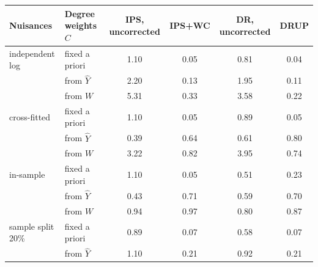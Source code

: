 \begin{tabular}{llcccc}
\toprule
Nuisances & Degree weights $C$ & IPS, uncorrected & IPS+WC & DR, uncorrected & DRUP\\
\midrule
independent log & fixed a priori & 1.10 & 0.05 & 0.81 & 0.04\\
 & from $\hat Y$ & 2.20 & 0.13 & 1.95 & 0.11\\
 & from $W$ & 5.31 & 0.33 & 3.58 & 0.22\\
\midrule
cross-fitted & fixed a priori & 1.10 & 0.05 & 0.89 & 0.05\\
 & from $\hat Y$ & 0.39 & 0.64 & 0.61 & 0.80\\
 & from $W$ & 3.22 & 0.82 & 3.95 & 0.74\\
\midrule
in-sample & fixed a priori & 1.10 & 0.05 & 0.51 & 0.23\\
 & from $\hat Y$ & 0.43 & 0.71 & 0.59 & 0.70\\
 & from $W$ & 0.94 & 0.97 & 0.80 & 0.87\\
\midrule
sample split 20\% & fixed a priori & 0.89 & 0.07 & 0.58 & 0.07\\
 & from $\hat Y$ & 1.10 & 0.21 & 0.92 & 0.21\\
\bottomrule
\end{tabular}
